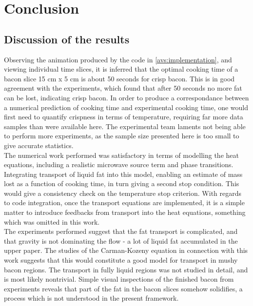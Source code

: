 \chapter{Conclusion}
\section{Discussion of the results}
Observing the animation produced by the code in \cref{avs:implementation}, and
viewing individual time slices, it is inferred that the optimal cooking time of
a bacon slice 15 cm x 5 cm is about 50 seconds for crisp bacon. This is in good
agreement with the experiments, which found that after 50 seconds no more fat
can be lost, indicating crisp bacon. In order to produce a correspondance
between a numerical prediction of cooking time and experimental cooking time,
one would first need to quantify crispness in terms of temperature, requiring
far more data samples than were available here. The experimental team laments
not being able to perform more experiments, as the sample size presented here is
too small to give accurate statistics. \\

The numerical work performed was satisfactory in terms of modelling the heat
equations, including a realistic microwave source term and phase transitions.
Integrating transport of liquid fat into this model, enabling an estimate of
mass lost as a function of cooking time, in turn giving a second stop condition.
This would give a consistency check on the temperature stop criterion. With
regards to code integration, once the transport equations are implemented, it is
a simple matter to introduce feedbacks from transport into the heat equations,
something which was omitted in this work. \\

The experiments performed suggest that 
the fat transport is complicated, and that gravity is not dominating the flow -
a lot of liquid fat accumulated in the upper paper. The studies of the
Carman-Kozeny equation in connection with this work suggests that this would
constitute a good model for transport in mushy bacon regions. The transport in
fully liquid regions was not studied in detail, and is most likely nontrivial.
Simple visual inspections of the finished bacon from experiments reveals that
part of the fat in the bacon slices somehow solidifies, a process which is not
understood in the present framework.

